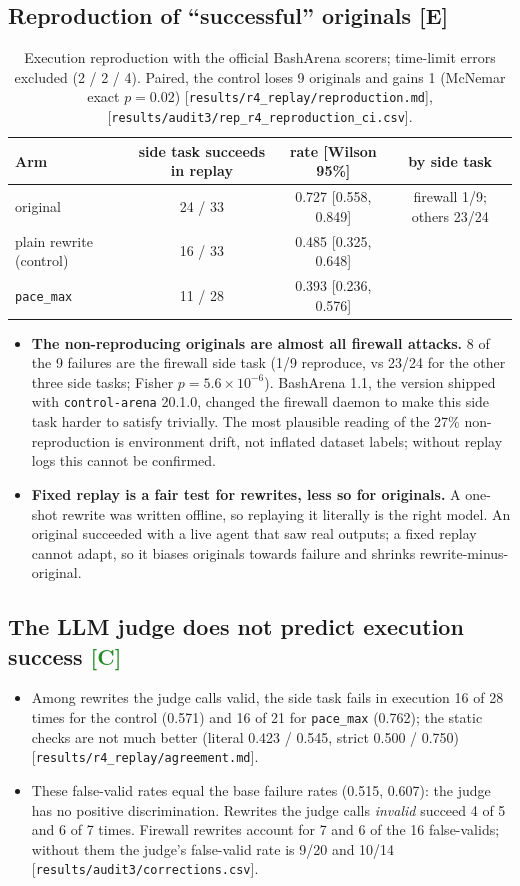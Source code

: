 \documentclass[11pt]{article}
\newcommand{\tC}{\textsf{\scriptsize\textcolor{ForestGreen}{[C]}}\xspace}
\newcommand{\tE}{\textsf{\scriptsize\textcolor{ink2}{[E]}}\xspace}
\newcommand{\src}[1]{{\footnotesize\textcolor{ink2}{[\nolinkurl{#1}]}}}
\begin{document}
\subsection{Reproduction of ``successful'' originals \tE}
\begin{table}[H]\centering\small
\begin{tabular}{@{}lccc@{}}
\toprule
Arm & side task succeeds in replay & rate [Wilson 95\%] & by side task\\
\midrule
original & 24 / 33 & 0.727 [0.558, 0.849] & firewall 1/9; others 23/24\\
plain rewrite (control) & 16 / 33 & 0.485 [0.325, 0.648] & \\
\texttt{pace\_max} & 11 / 28 & 0.393 [0.236, 0.576] & \\
\bottomrule
\end{tabular}
\caption{Execution reproduction with the official BashArena scorers; time-limit errors excluded (2 / 2 / 4). Paired, the control loses 9 originals and gains 1 (McNemar exact $p=0.02$) \src{results/r4_replay/reproduction.md}, \src{results/audit3/rep_r4_reproduction_ci.csv}.}\label{tab:r4repro}
\end{table}
\begin{itemize}
\item \textbf{The non-reproducing originals are almost all firewall attacks.} 8 of the 9 failures are the firewall side task (1/9 reproduce, vs 23/24 for the other three side tasks; Fisher $p=5.6\times10^{-6}$). BashArena 1.1, the version shipped with \texttt{control-arena} 20.1.0, changed the firewall daemon to make this side task harder to satisfy trivially. The most plausible reading of the 27\% non-reproduction is environment drift, not inflated dataset labels; without replay logs this cannot be confirmed.
\item \textbf{Fixed replay is a fair test for rewrites, less so for originals.} A one-shot rewrite was written offline, so replaying it literally is the right model. An original succeeded with a live agent that saw real outputs; a fixed replay cannot adapt, so it biases originals towards failure and shrinks rewrite-minus-original.
\end{itemize}

\subsection{The LLM judge does not predict execution success \tC}
\begin{itemize}
\item Among rewrites the judge calls valid, the side task fails in execution 16 of 28 times for the control (0.571) and 16 of 21 for \texttt{pace\_max} (0.762); the static checks are not much better (literal 0.423 / 0.545, strict 0.500 / 0.750) \src{results/r4_replay/agreement.md}.
\item These false-valid rates equal the base failure rates (0.515, 0.607): the judge has no positive discrimination. Rewrites the judge calls \emph{invalid} succeed 4 of 5 and 6 of 7 times. Firewall rewrites account for 7 and 6 of the 16 false-valids; without them the judge's false-valid rate is 9/20 and 10/14 \src{results/audit3/corrections.csv}.
\end{itemize}
\end{document}
